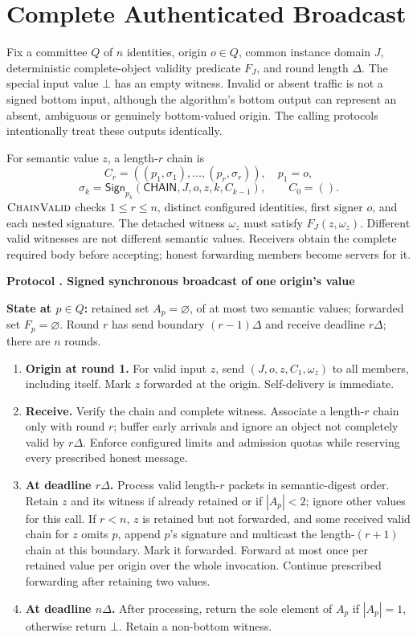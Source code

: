 \documentclass[11pt,a4paper,onecolumn]{article}
\newcommand{\Sig}{\mathsf{Sign}}
\newcommand{\botv}{\bot}
\newcommand{\Tag}[1]{\mathsf{#1}}
\newcommand{\Proc}[1]{\textnormal{\textsc{#1}}}
\theoremstyle{remark}\newtheorem{example}[definition]{Example}
\newcounter{protocol}
\newenvironment{protocol}[2]{\refstepcounter{protocol}\label{#1}\begin{mdframed}[nobreak=true,linewidth=.6pt,skipabove=10pt,skipbelow=10pt,innertopmargin=8pt,innerbottommargin=8pt]\small\raggedright\noindent\textbf{Protocol \theprotocol. #2}\par\smallskip}{\end{mdframed}}
\begin{document}
\appendix
\section{Complete Authenticated Broadcast}\label{app:ab}
Fix a committee $Q$ of $n$ identities, origin $o\in Q$, common instance domain
$J$, deterministic complete-object validity predicate $F_J$, and round length
$\Delta$. The special input value $\botv$ has an empty witness. Invalid or absent
traffic is not a signed bottom input, although the algorithm's bottom output
can represent an absent, ambiguous or genuinely bottom-valued origin. The
calling protocols intentionally treat these outputs identically.

For semantic value $z$, a length-$r$ chain is
\[
 C_r=((p_1,\sigma_1),\ldots,(p_r,\sigma_r)),\quad p_1=o,
\]
\[
 \sigma_k=\Sig_{p_k}(\Tag{CHAIN},J,o,z,k,C_{k-1}),\qquad C_0=().
\]
$\Proc{ChainValid}$ checks $1\leq r\leq n$, distinct configured identities,
first signer $o$, and each nested signature. The detached witness $\omega_z$
must satisfy $F_J(z,\omega_z)$. Different valid witnesses are not different
semantic values. Receivers obtain the complete required body before accepting;
honest forwarding members become servers for it.

\begin{protocol}{alg:ab}{Signed synchronous broadcast of one origin's value}
\textbf{State at $p\in Q$:} retained set $A_p=\varnothing$, of at most two
semantic values; forwarded set $F_p=\varnothing$. Round $r$ has send boundary
$(r-1)\Delta$ and receive deadline $r\Delta$; there are $n$ rounds.
\begin{enumerate}[label=\textbf{A\arabic*.}]
\item \textbf{Origin at round 1.} For valid input $z$, send
$(J,o,z,C_1,\omega_z)$ to all members, including itself. Mark $z$ forwarded
at the origin. Self-delivery is immediate.
\item \textbf{Receive.} Verify the chain and complete witness. Associate a
length-$r$ chain only with round $r$; buffer early arrivals and ignore an object
not completely valid by $r\Delta$. Enforce configured limits and admission
quotas while reserving every prescribed honest message.
\item \textbf{At deadline $r\Delta$.} Process valid length-$r$ packets in
semantic-digest order. Retain $z$ and its witness if already retained or if
$|A_p|<2$; ignore other values for this call. If $r<n$, $z$ is retained but not
forwarded, and some received valid chain for $z$ omits $p$, append $p$'s signature
and multicast the length-$(r+1)$ chain at this boundary. Mark it forwarded.
Forward at most once per retained value per origin over the whole invocation.
Continue prescribed forwarding after retaining two values.
\item \textbf{At deadline $n\Delta$.} After processing, return the sole element
of $A_p$ if $|A_p|=1$, otherwise return $\botv$. Retain a non-bottom witness.
\end{enumerate}
\end{protocol}
\end{document}
